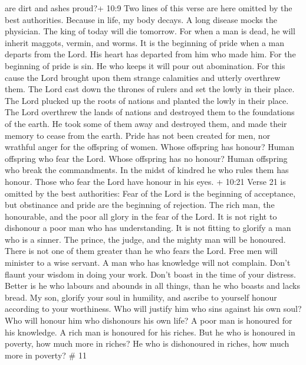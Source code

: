 are dirt and ashes proud?+ 10:9 Two lines of this verse are here omitted
by the best authorities. Because in life, my body decays. 
A long disease mocks the physician. The king of today will die tomorrow.
 For when a man is dead, he will inherit maggots, vermin,
and worms.  It is the beginning of pride when a man departs
from the Lord. His heart has departed from him who made him.
 For the beginning of pride is sin. He who keeps it will
pour out abomination. For this cause the Lord brought upon them strange
calamities and utterly overthrew them.  The Lord cast down
the thrones of rulers and set the lowly in their place. 
The Lord plucked up the roots of nations and planted the lowly in their
place.  The Lord overthrew the lands of nations and
destroyed them to the foundations of the earth.  He took
some of them away and destroyed them, and made their memory to cease
from the earth.  Pride has not been created for men, nor
wrathful anger for the offspring of women.  Whose offspring
has honour? Human offspring who fear the Lord. Whose offspring has no
honour? Human offspring who break the commandments.  In the
midst of kindred he who rules them has honour. Those who fear the Lord
have honour in his eyes.  + 10:21 Verse 21 is omitted by
the best authorities: Fear of the Lord is the beginning of acceptance,
but obstinance and pride are the beginning of rejection. 
The rich man, the honourable, and the poor all glory in the fear of the
Lord.  It is not right to dishonour a poor man who has
understanding. It is not fitting to glorify a man who is a sinner.
 The prince, the judge, and the mighty man will be
honoured. There is not one of them greater than he who fears the Lord.
 Free men will minister to a wise servant. A man who has
knowledge will not complain.  Don't flaunt your wisdom in
doing your work. Don't boast in the time of your distress. 
Better is he who labours and abounds in all things, than he who boasts
and lacks bread.  My son, glorify your soul in humility,
and ascribe to yourself honour according to your worthiness.
 Who will justify him who sins against his own soul? Who
will honour him who dishonours his own life?  A poor man is
honoured for his knowledge. A rich man is honoured for his riches.
 But he who is honoured in poverty, how much more in
riches? He who is dishonoured in riches, how much more in poverty? \# 11
